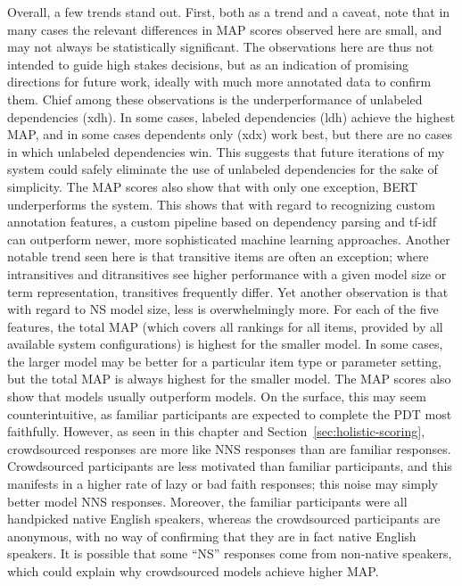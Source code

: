 Overall, a few trends stand out. First, both as a trend and a caveat, note that in many cases the relevant differences in MAP scores observed here are small, and may not always be statistically significant.
The observations here are thus not intended to guide high stakes decisions, but as an indication of promising directions for future work, ideally with much more annotated data to confirm them.  Chief among these observations is the underperformance of unlabeled dependencies (xdh). In some cases, labeled dependencies (ldh) achieve the highest MAP, and in some cases dependents only (xdx) work best, but there are no cases in which unlabeled dependencies win. This suggests that future iterations of my system could safely eliminate the use of unlabeled dependencies for the sake of simplicity. The MAP scores also show that with only one exception, BERT underperforms the system. 
This shows that with regard to recognizing custom annotation features, a custom pipeline based on dependency parsing and tf-idf can outperform newer, more sophisticated machine learning approaches.  Another notable trend seen here is that transitive items are often an exception; where intransitives and ditransitives see higher performance with a given model size or term representation, transitives frequently differ. Yet another observation is that with regard to NS model size, less is overwhelmingly more. For each of the five features, the total MAP (which covers all rankings for all items, provided by all available system configurations) is highest for the smaller model. In some cases, the larger model may be better for a particular item type or parameter setting, but the total MAP is always highest for the smaller model. The MAP scores also show that  models usually outperform  models. On the surface, this may seem counterintuitive, as familiar participants are expected to complete the PDT most faithfully. However, as seen in this chapter and Section~\ref{sec:holistic-scoring}, crowdsourced responses are more like NNS responses than are familiar responses. Crowdsourced participants are less motivated than familiar participants, and this manifests in a higher rate of lazy or bad faith responses; this noise may simply better model NNS responses. Moreover, the familiar participants were all handpicked native English speakers, whereas the crowdsourced participants are anonymous, with no way of confirming that they are in fact native English speakers. It is possible that some ``NS'' responses come from non-native speakers, which could explain why crowdsourced models achieve higher MAP.
